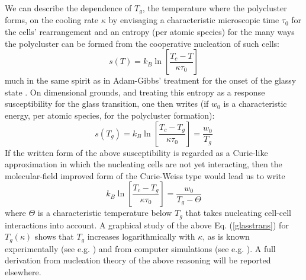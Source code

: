 \documentclass[10pt]{article}
\begin{document}
We can describe the dependence of $T_g$, the temperature where the polycluster
forms, on the cooling rate $\kappa$ by envisaging a characteristic microscopic 
time $\tau_0$ for the cells' rearrangement and an entropy (per atomic species) for 
the many ways the polycluster can be formed from the cooperative nucleation of 
such cells:
\begin{equation}
s(T)=k_B \ln\left[ \frac{T_c-T}{\kappa\tau_0} \right]
\end{equation}
much in the same spirit as in Adam-Gibbs' treatment for the onset of the glassy
state \cite{AG1965}. On dimensional grounds, and treating this entropy  as a 
response susceptibility for the glass transition, one then writes (if $w_0$ is a 
characteristic energy, per atomic species, for the polycluster formation):
\begin{equation}
s(T_g)=k_B \ln\left[ \frac{T_c-T_g}{\kappa\tau_0} \right]=\frac{w_0}{T_g}
\end{equation}
If the written form of the above susceptibility is regarded as a Curie-like approximation
in which the nucleating cells are not yet interacting, then the molecular-field 
improved form of the Curie-Weiss type would lead us to write
\begin{equation}
k_B \ln\left[ \frac{T_c-T_g}{\kappa\tau_0} \right]=\frac{w_0}{T_g-\Theta}
\label{glasstrans}
\end{equation}
where $\Theta$ is a characteristic temperature below $T_g$ that takes nucleating 
cell-cell interactions into account. A graphical study of the above Eq. (\ref{glasstrans})
for $T_g(\kappa)$ shows that $T_g$ increases logarithmically with $\kappa$, as is 
known experimentally (see e.g. \cite{Sim1996}) and from computer simulations (see
e.g. \cite{Buc2002}). A full derivation from nucleation theory of the above reasoning 
will be reported elsewhere.
\end{document}
